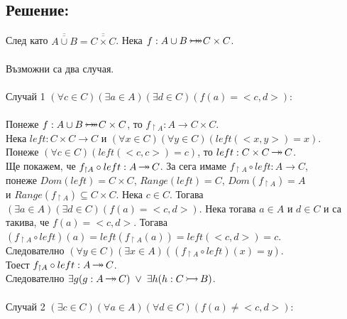 \documentclass[12pt]{article}
\newcommand{\injection}[0]{\,\mathlarger{\mathlarger{\rightarrowtail}}\,}
\newcommand{\surjection}[0]{\,\mathlarger{\mathlarger{\twoheadrightarrow}}\,}
\newcommand{\bijection}[0]{\mathbin{\mathlarger{\mathlarger{\rightarrowtail}} \hspace{-14pt} \mathlarger{\mathlarger{\twoheadrightarrow}}}}
\begin{document}
\subsection*{Решение:}
След като \(\overline{\overline{A \cup B}} = \overline{\overline{C \times C}}\).
Нека \(f : A \cup B \bijection C \times C\).
\\
\vspace{1mm}
\\
Възможни са два случая.
\\
\vspace{1mm}
\\
Случай 1 \((\forall c \in C)(\exists a \in A)(\exists d \in C)(f(a) = <c, d>)\):
\\
\vspace{1mm}
\\
Понеже \(f : A \cup B \bijection C \times C\), то \(f_{\restriction A} : A \to C \times C\).\\
Нека \(left : C \times C \to C\) и \((\forall x \in C)(\forall y \in C)(left(<x, y>) = x)\).
\\
Понеже \((\forall c \in C)(left(<c, c>) = c)\), то \(left : C \times C \surjection C\).
\\
Ще покажем, че \(f_{\restriction A} \circ left : A \surjection C\).
За сега имаме \(f_{\restriction A} \circ left : A \to C\),
\\
понеже \(Dom(left) = C \times C\),
\(Range(left) = C\), \(Dom(f_{\restriction A}) = A\)
\\
и \(Range(f_{\restriction A}) \subseteq C \times C\).
Нека \(c \in C\). Тогава
\\
\((\exists a \in A)(\exists d \in C)(f(a) = <c, d>)\).
Нека тогава \(a \in A\) и \(d \in C\) и са такива, че \(f(a) = <c, d>\).
Тогава \((f_{\restriction A} \circ left)(a) = left(f_{\restriction A}(a)) = left(<c, d>) = c\).
\\
Следователно \((\forall y \in C)(\exists x \in A)((f_{\restriction A} \circ left)(x) = y)\).
\\
Тоест \(f_{\restriction A} \circ left : A \surjection C\).
\\
Следователно \(\exists g (g : A \surjection C) \; \lor \; \exists h (h : C \injection B)\). 
\\
\vspace{1mm}
\\
Случай 2 \((\exists c \in C)(\forall a \in A)(\forall d \in C)(f(a) \neq <c, d>)\):
\\
\vspace{1mm}
\\
\end{document}
